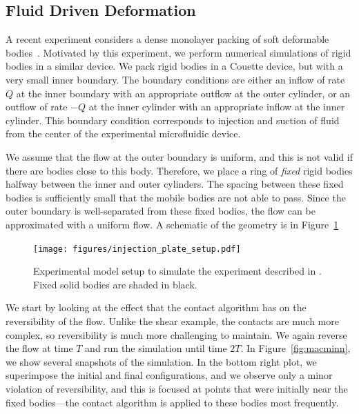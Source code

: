 \documentclass[preprint, 10pt]{elsarticle}
\begin{document}
\subsection{Fluid Driven Deformation}
A recent experiment considers a dense monolayer packing of soft
deformable bodies~\cite{MacMinn2015}.  Motivated by this experiment, we
perform numerical simulations of rigid bodies in a similar device.  We
pack rigid bodies in a Couette device, but with a very small inner
boundary.  The boundary conditions are either an inflow of rate $Q$ at
the inner boundary with an appropriate outflow at the outer cylinder, or
an outflow of rate $-Q$ at the inner cylinder with an appropriate inflow
at the inner cylinder.  This boundary condition corresponds to injection
and suction of fluid from the center of the experimental microfluidic
device.

We assume that the flow at the outer boundary is uniform, and this is
not valid if there are bodies close to this body.  Therefore, we place a
ring of {\em fixed} rigid bodies halfway between the inner and outer
cylinders.  The spacing between these fixed bodies is sufficiently small
that the mobile bodies are not able to pass.  Since the outer boundary is
well-separated from these fixed bodies, the flow can be approximated
with a uniform flow.  A schematic of the geometry is in
Figure~\ref{fig:radial}

\begin{figure}[h!]
\begin{center}
\texttt{[image: figures/injection\_plate\_setup.pdf]}
\end{center}
\caption{Experimental model setup to simulate the experiment described
in \cite{MacMinn2015}. Fixed solid bodies are shaded in
black.}\label{fig:radial}
\end{figure}

We start by looking at the effect that the contact algorithm has on the
reversibility of the flow.  Unlike the shear example, the contacts are
much more complex, so reversibility is much more challenging to
maintain.  We again reverse the flow at time $T$ and run the simulation
until time $2T$.  In Figure~\ref{fig:macminn}, we show several snapshots
of the simulation.  In the bottom right plot, we superimpose the initial
and final configurations, and we observe only a minor violation of
reversibility, and this is focused at points that were initially near
the fixed bodies---the contact algorithm is applied to these bodies
most frequently.
\end{document}

